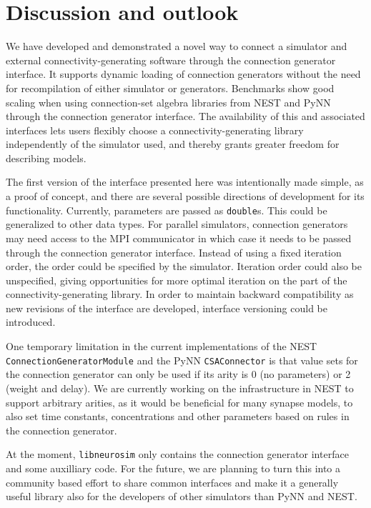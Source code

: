 \documentclass{frontiersSCNS} %
\begin{document}

\section{Discussion and outlook}

We have developed and demonstrated a novel way to connect a simulator
and external connectivity-generating software through the connection
generator interface. It supports dynamic loading of connection
generators without the need for recompilation of either simulator or
generators. Benchmarks show good scaling when using connection-set
algebra libraries from NEST and PyNN through the connection generator
interface. The availability of this and associated interfaces lets
users flexibly choose a connectivity-generating library independently
of the simulator used, and thereby grants greater freedom for
describing models.

The first version of the interface presented here was intentionally
made simple, as a proof of concept, and there are several possible
directions of development for its functionality. Currently, parameters
are passed as \verb|double|s. This could be generalized to other data
types.  For parallel simulators, connection generators may need access
to the MPI communicator in which case it needs to be passed through
the connection generator interface.  Instead of using a fixed
iteration order, the order could be specified by the
simulator. Iteration order could also be unspecified, giving
opportunities for more optimal iteration on the part of the
connectivity-generating library.  In order to maintain backward
compatibility as new revisions of the interface are developed,
interface versioning could be introduced.

One temporary limitation in the current implementations of the NEST
\verb|ConnectionGeneratorModule| and the PyNN \verb|CSAConnector| is
that value sets for the connection generator can only be used if its
arity is 0 (no parameters) or 2 (weight and delay). We are currently
working on the infrastructure in NEST to support arbitrary arities, as
it would be beneficial for many synapse models, to also set time
constants, concentrations and other parameters based on rules in the
connection generator.

At the moment, \verb|libneurosim| only contains the connection
generator interface and some auxilliary code. For the future, we are
planning to turn this into a community based effort to share common
interfaces and make it a generally useful library also for the
developers of other simulators than PyNN and NEST.
\end{document}
